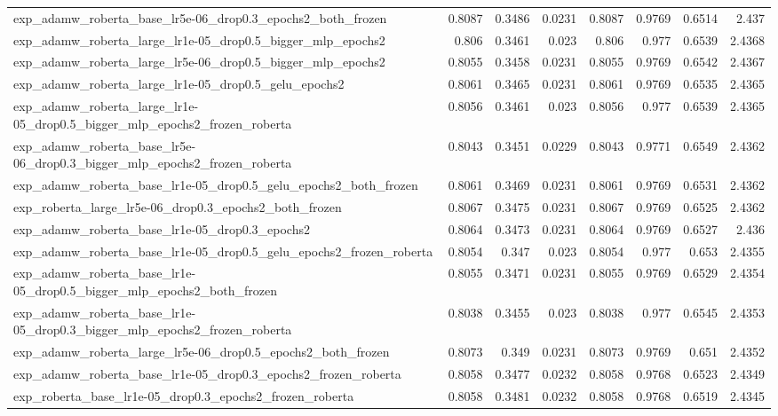\documentclass[a4paper,oneside,bibliography=totoc]{scrbook}
\begin{document}
\begin{landscape}
\begin{center}
\begin{longtable}{p{4cm} *{7}{r}}
        exp\_adamw\_roberta\_base\_lr5e-06\_drop0.3\_epochs2\_both\_frozen & 0.8087 & 0.3486 & 0.0231 & 0.8087 & 0.9769 & 0.6514 & 2.437 \\ 
        exp\_adamw\_roberta\_large\_lr1e-05\_drop0.5\_bigger\_mlp\_epochs2 & 0.806 & 0.3461 & 0.023 & 0.806 & 0.977 & 0.6539 & 2.4368 \\ 
        exp\_adamw\_roberta\_large\_lr5e-06\_drop0.5\_bigger\_mlp\_epochs2 & 0.8055 & 0.3458 & 0.0231 & 0.8055 & 0.9769 & 0.6542 & 2.4367 \\ 
        exp\_adamw\_roberta\_large\_lr1e-05\_drop0.5\_gelu\_epochs2 & 0.8061 & 0.3465 & 0.0231 & 0.8061 & 0.9769 & 0.6535 & 2.4365 \\ 
        exp\_adamw\_roberta\_large\_lr1e-05\_drop0.5\_bigger\_mlp\_epochs2\_frozen\_roberta & 0.8056 & 0.3461 & 0.023 & 0.8056 & 0.977 & 0.6539 & 2.4365 \\ 
        exp\_adamw\_roberta\_base\_lr5e-06\_drop0.3\_bigger\_mlp\_epochs2\_frozen\_roberta & 0.8043 & 0.3451 & 0.0229 & 0.8043 & 0.9771 & 0.6549 & 2.4362 \\ 
        exp\_adamw\_roberta\_base\_lr1e-05\_drop0.5\_gelu\_epochs2\_both\_frozen & 0.8061 & 0.3469 & 0.0231 & 0.8061 & 0.9769 & 0.6531 & 2.4362 \\ 
        exp\_roberta\_large\_lr5e-06\_drop0.3\_epochs2\_both\_frozen & 0.8067 & 0.3475 & 0.0231 & 0.8067 & 0.9769 & 0.6525 & 2.4362 \\ 
        exp\_adamw\_roberta\_base\_lr1e-05\_drop0.3\_epochs2 & 0.8064 & 0.3473 & 0.0231 & 0.8064 & 0.9769 & 0.6527 & 2.436 \\ 
        exp\_adamw\_roberta\_base\_lr1e-05\_drop0.5\_gelu\_epochs2\_frozen\_roberta & 0.8054 & 0.347 & 0.023 & 0.8054 & 0.977 & 0.653 & 2.4355 \\ 
        exp\_adamw\_roberta\_base\_lr1e-05\_drop0.5\_bigger\_mlp\_epochs2\_both\_frozen & 0.8055 & 0.3471 & 0.0231 & 0.8055 & 0.9769 & 0.6529 & 2.4354 \\ 
        exp\_adamw\_roberta\_base\_lr1e-05\_drop0.3\_bigger\_mlp\_epochs2\_frozen\_roberta & 0.8038 & 0.3455 & 0.023 & 0.8038 & 0.977 & 0.6545 & 2.4353 \\ 
        exp\_adamw\_roberta\_large\_lr5e-06\_drop0.5\_epochs2\_both\_frozen & 0.8073 & 0.349 & 0.0231 & 0.8073 & 0.9769 & 0.651 & 2.4352 \\ 
        exp\_adamw\_roberta\_base\_lr1e-05\_drop0.3\_epochs2\_frozen\_roberta & 0.8058 & 0.3477 & 0.0232 & 0.8058 & 0.9768 & 0.6523 & 2.4349 \\ 
        exp\_roberta\_base\_lr1e-05\_drop0.3\_epochs2\_frozen\_roberta & 0.8058 & 0.3481 & 0.0232 & 0.8058 & 0.9768 & 0.6519 & 2.4345 \\ 

\end{longtable}
\end{center}
\end{landscape}
\end{document}
